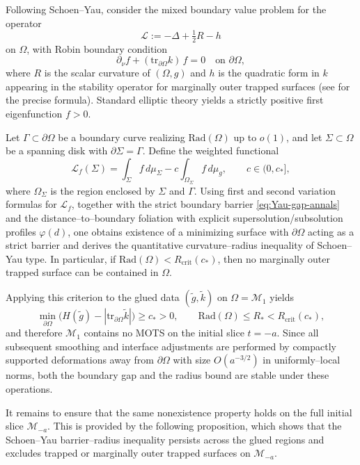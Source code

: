 \documentclass{amsart}
\newcommand{\tr}{\mbox{tr}}
\begin{document}
{\noindent Following Schoen–Yau, consider the mixed boundary value problem for the operator
\[
\mathcal L:=-\Delta+\tfrac12 R-h
\]
on $\Omega$, with Robin boundary condition
\[
\partial_\nu f + (\tr_{\partial\Omega}k)\, f=0
\quad\text{on }\partial\Omega,
\]
where $R$ is the scalar curvature of $(\Omega,g)$ and $h$ is the quadratic form in $k$ appearing in the stability operator for marginally outer trapped surfaces (see \cite{yau} for the precise formula). Standard elliptic theory yields a strictly positive first eigenfunction $f>0$.

\noindent Let $\Gamma\subset\partial\Omega$ be a boundary curve realizing $\text{Rad}(\Omega)$ up to $o(1)$, and let $\Sigma\subset\Omega$ be a spanning disk with $\partial\Sigma=\Gamma$. Define the weighted functional
\[
\mathcal L_f(\Sigma)
=
\int_{\Sigma} f \, d\mu_\Sigma
-
c\int_{\Omega_\Sigma} f \, d\mu_g,
\qquad c\in(0,c_*],
\]
where $\Omega_\Sigma$ is the region enclosed by $\Sigma$ and $\Gamma$. Using first and second variation formulas for $\mathcal L_f$, together with the strict boundary barrier \eqref{eq:Yau-gap-annals} and the distance–to–boundary foliation with explicit supersolution/subsolution profiles $\varphi(d)$, one obtains existence of a minimizing surface with $\partial\Omega$ acting as a strict barrier and derives the quantitative curvature–radius inequality of Schoen–Yau type. In particular, if $\text{Rad}(\Omega)<R_{\mathrm{crit}}(c_*)$, then no marginally outer trapped surface can be contained in $\Omega$.

\noindent Applying this criterion to the glued data $(\tilde g,\tilde k)$ on $\Omega=\mathcal M_{1}$ yields
\[
\min_{\partial\Omega}\Big(H(\tilde g)-|\tr_{\partial\Omega}\tilde k|\Big)\ge c_*>0,
\qquad
\text{Rad}(\Omega)\le R_*<R_{\mathrm{crit}}(c_*),
\]
and therefore $\mathcal M_{1}$ contains no MOTS on the initial slice $t=-a$. Since all subsequent smoothing and interface adjustments are performed by compactly supported deformations away from $\partial\Omega$ with size $O(a^{-3/2})$ in uniformly–local norms, both the boundary gap and the radius bound are stable under these operations.

\noindent It remains to ensure that the same nonexistence property holds on the full initial slice $\mathcal M_{-a}$. This is provided by the following proposition, which shows that the Schoen–Yau barrier–radius inequality persists across the glued regions and excludes trapped or marginally outer trapped surfaces on $\mathcal M_{-a}$.


}
\end{document}
